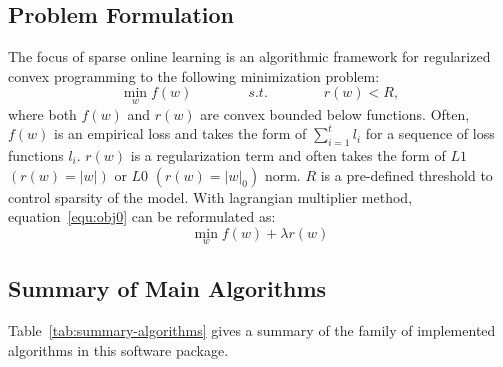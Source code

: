 \documentclass[11pt,a4paper]{article}
\begin{document}
\subsection{Problem Formulation}
The focus of sparse online learning is an algorithmic framework for regularized
convex programming to the following minimization problem:
\begin{equation}
    \min_{w}{f(w)} \qquad \qquad s.t. \qquad \qquad r(w) < R,
    \label{equ:obj0}
\end{equation}
where both $f(w)$ and $r(w)$ are convex bounded below functions. Often, $f(w)$
is an empirical loss and takes the form of $\sum_{i=1}^t{l_i}$ for a sequence
of loss functions $l_i$. $r(w)$ is a regularization term and often takes the
form of $\textit{L1}$ $(r(w) = |w|)$ or $\textit{L0}$ $(r(w) = |w|_0)$ norm.
$R$ is a pre-defined threshold to control sparsity of the model. With
lagrangian multiplier method, equation~\eqref{equ:obj0} can be reformulated as:
\begin{equation}
    \min_{w}{f(w) + \lambda r(w)}
    \label{equ:obj}
\end{equation}

\subsection{Summary of Main Algorithms}
Table~\ref{tab:summary-algorithms} gives a summary of the family of implemented algorithms in this software package. 
\end{document}
